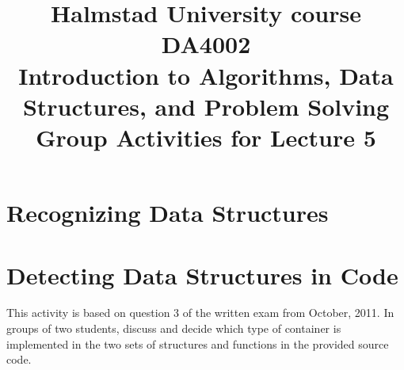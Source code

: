 \documentclass[a4paper]{article}
\begin{document}
\title{
  {\small
    Halmstad University course DA4002\\
    Introduction to Algorithms, Data Structures, and Problem Solving\\
  }
  Group Activities for Lecture 5
}
\maketitle



\section{Recognizing Data Structures}



\section{Detecting Data Structures in Code}

This activity is based on question 3 of the written exam from October, 2011.
In groups of two students, discuss and decide which type of container is implemented in the two sets of structures and functions in the provided source code.
\end{document}
